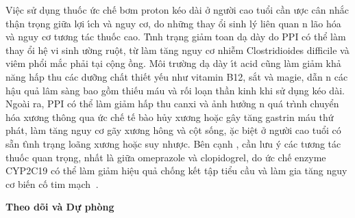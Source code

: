 \documentclass[9pt,twocolumn]{article}
\begin{document}
Vi{\^{\d{e}}}c sử d\d{u}ng thuốc ức ch{{\'{\^{e}}}} bơm proton k{\'e}o d\`{a}i ở người cao tuổi cần \text{\dj}ược c\^{a}n nhắc th{\^{\d{a}}}n tr\d{o}ng giữa lợi \'{\i}ch v\`{a} nguy cơ, do những thay \text{\dj}ổi sinh l\'{y} li{\^{e}}n quan n l{\~{a}}o h{\'{o}}a v\`{a} nguy cơ tương t\'{a}c thuốc cao. T\`{\i}nh tr{\d{a}}ng giảm toan d{\d{a}} d\`{a}y do PPI c{\'{o}} thể l\`{a}m thay \text{\dj}ổi h{\^{\d{e}}} vi sinh \text{\dj}ường ru{\^{\d{o}}}t, từ  l\`{a}m t{\u{a}}ng nguy cơ nhi{\~{\^e}}m Clostridioides difficile v\`{a} vi{\^{e}}m phổi mắc phải t{\d{a}}i c{\^{\d{o}}}ng \text{\dj}ồng. M{\^o}i trường d{\d{a}} d\`{a}y \'{\i}t acid c{\~{u}}ng l\`{a}m giảm khả n{\u{a}}ng hấp thu c\'{a}c dưỡng chất thi{{\'{\^{e}}}}t y{{\'{\^{e}}}}u như vitamin B12, sắt v\`{a} magie, dẫn n c\'{a}c h{\^{\d{a}}}u quả l\^{a}m s\`{a}ng bao gồm thi{{\'{\^{e}}}}u m\'{a}u v\`{a} rối lo{\d{a}}n thần kinh khi sử d\d{u}ng k{\'e}o d\`{a}i. Ngo\`{a}i ra, PPI c{\'{o}} thể l\`{a}m giảm hấp thu canxi v\`{a} ảnh hưởng n qu\'{a} tr\`{\i}nh chuyển h{\'{o}}a xương th{\^o}ng qua ức ch{{\'{\^{e}}}} t{{\'{\^{e}}}} b\`{a}o hủy xương hoặc g\^{a}y t{\u{a}}ng gastrin m\'{a}u thứ ph\'{a}t, l\`{a}m t{\u{a}}ng nguy cơ g{\~{a}}y xương h{\^o}ng v\`{a} c{\^{\d{o}}}t sống, \text{\dj}ặc bi{\^{\d{e}}}t ở người cao tuổi c{\'{o}} sẵn t\`{\i}nh tr{\d{a}}ng lo{\~{a}}ng xương hoặc suy nhược. B{\^{e}}n c{\d{a}}nh , cần lưu \'{y} c\'{a}c tương t\'{a}c thuốc quan tr\d{o}ng, nhất l\`{a} giữa omeprazole v\`{a} clopidogrel, do ức ch{{\'{\^{e}}}} enzyme CYP2C19 c{\'{o}} thể l\`{a}m giảm hi{\^{\d{e}}}u quả chống k{{\'{\^{e}}}}t t{\^{\d{a}}}p tiểu cầu v\`{a} l\`{a}m gia t{\u{a}}ng nguy cơ bi{{\'{\^{e}}}}n cố tim m{\d{a}}ch\unskip~\cite{2901310:34531807,2901310:34531808,2901310:34531813,2901310:34531814,2901310:34531815}\ensuremath{^{}}.

\textbf{Theo d{\~{o}}i v\`{a} Dự ph\`{o}ng}
\end{document}
